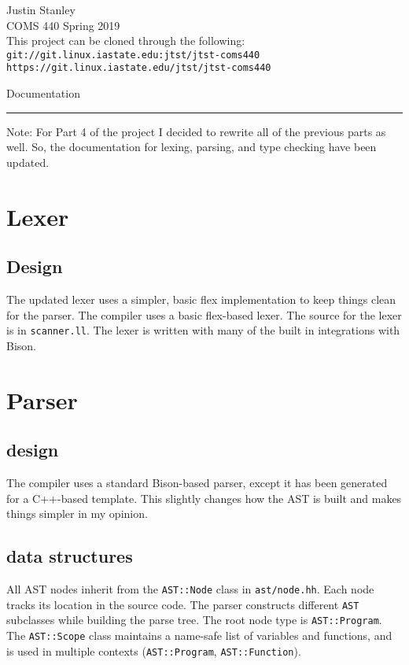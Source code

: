 \documentclass{article}
\begin{document}
\noindent
Justin Stanley \\
COMS 440 Spring 2019 \\
This project can be cloned through the following: \\
\texttt{git://git.linux.iastate.edu:jtst/jtst-coms440} \\
\texttt{https://git.linux.iastate.edu/jtst/jtst-coms440} \\
\begin{center}\Large{Documentation}\end{center}
\vspace{0.5cm}
\hrule
\vspace{0.5cm}
Note: For Part 4 of the project I decided to rewrite all of the previous parts as well. So, the documentation for lexing, parsing, and type checking have been updated.
\section{Lexer}
\subsection{Design}
The updated lexer uses a simpler, basic flex implementation to keep things clean for the parser.
The compiler uses a basic flex-based lexer. The source for the lexer is in \texttt{scanner.ll}.
The lexer is written with many of the built in integrations with Bison.
\section{Parser}
\subsection{design}
The compiler uses a standard Bison-based parser, except it has been generated for a C++-based template.
This slightly changes how the AST is built and makes things simpler in my opinion.
\subsection{data structures}
All AST nodes inherit from the \texttt{AST::Node} class in \texttt{ast/node.hh}. Each node tracks its location in the source code.
The parser constructs different \texttt{AST} subclasses while building the parse tree. The root node type is \texttt{AST::Program}.
The \texttt{AST::Scope} class maintains a name-safe list of variables and functions, and is used in multiple contexts (\texttt{AST::Program}, \texttt{AST::Function}).
\end{document}
